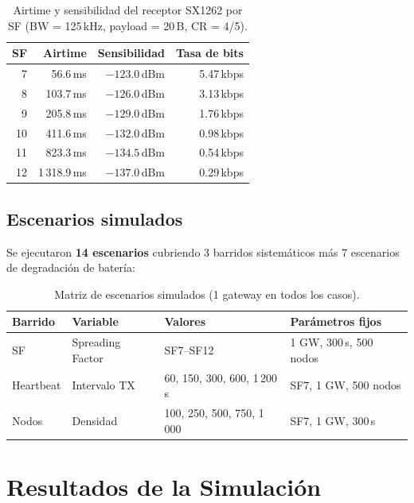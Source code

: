 \documentclass[12pt,letterpaper]{article}
\begin{document}
\begin{table}[H]
\centering
\caption{Airtime y sensibilidad del receptor SX1262 por SF
         (BW = 125\,kHz, payload = 20\,B, CR = 4/5).}
\label{tab:airtime}
\begin{tabular}{rrrr}
\toprule
\textbf{SF} & \textbf{Airtime} & \textbf{Sensibilidad} & \textbf{Tasa de bits} \\
\midrule
 7 &    56.6\,ms & $-123.0$\,dBm & 5.47\,kbps \\
 8 &   103.7\,ms & $-126.0$\,dBm & 3.13\,kbps \\
 9 &   205.8\,ms & $-129.0$\,dBm & 1.76\,kbps \\
10 &   411.6\,ms & $-132.0$\,dBm & 0.98\,kbps \\
11 &   823.3\,ms & $-134.5$\,dBm & 0.54\,kbps \\
12 & 1\,318.9\,ms & $-137.0$\,dBm & 0.29\,kbps \\
\bottomrule
\end{tabular}
\end{table}

\subsection{Escenarios simulados}

Se ejecutaron \textbf{14 escenarios} cubriendo 3 barridos sistemáticos
más 7 escenarios de degradación de batería:

\begin{table}[H]
\centering
\caption{Matriz de escenarios simulados (1 gateway en todos los casos).}
\label{tab:scenarios}
\begin{tabular}{llll}
\toprule
\textbf{Barrido} & \textbf{Variable} & \textbf{Valores} & \textbf{Parámetros fijos} \\
\midrule
SF        & Spreading Factor & SF7--SF12                   & 1 GW, 300\,s, 500 nodos \\
Heartbeat & Intervalo TX     & 60, 150, 300, 600, 1\,200\,s & SF7, 1 GW, 500 nodos \\
Nodos     & Densidad         & 100, 250, 500, 750, 1\,000  & SF7, 1 GW, 300\,s \\
\bottomrule
\end{tabular}
\end{table}

\section{Resultados de la Simulación}
\end{document}

